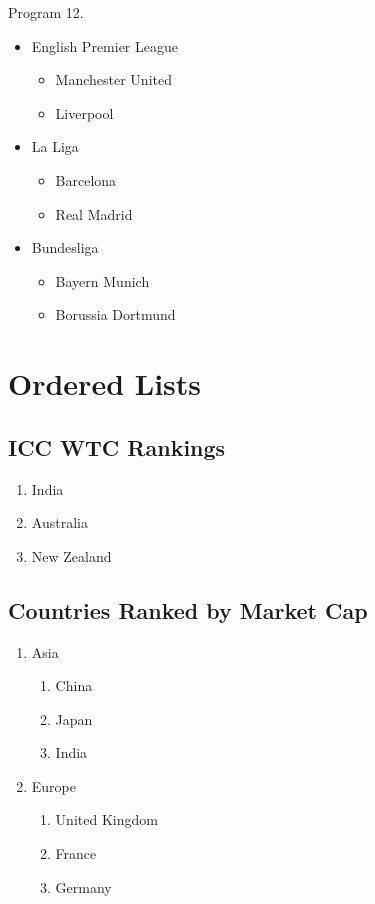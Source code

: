 Program 12.                   \documentclass[12pt]{report}
\begin{document}
\begin{itemize}

\item English Premier League

\begin{itemize}
\item Manchester United
\item Liverpool
\end{itemize}

\item La Liga

\begin{itemize}
\item Barcelona
\item Real Madrid
\end{itemize}

\item Bundesliga

\begin{itemize}
\item Bayern Munich
\item Borussia Dortmund
\end{itemize}

\end{itemize}

\section{Ordered Lists}

\subsection{ICC WTC Rankings}

\begin{enumerate}
\item India
\item Australia
\item New Zealand
\end{enumerate}

\subsection{Countries Ranked by Market Cap}

\begin{enumerate}

\item Asia

\begin{enumerate}
\item China
\item Japan
\item India
\end{enumerate}

\item Europe

\begin{enumerate}
\item United Kingdom
\item France
\item Germany
\end{enumerate}

\end{enumerate}
	
\end{document}

